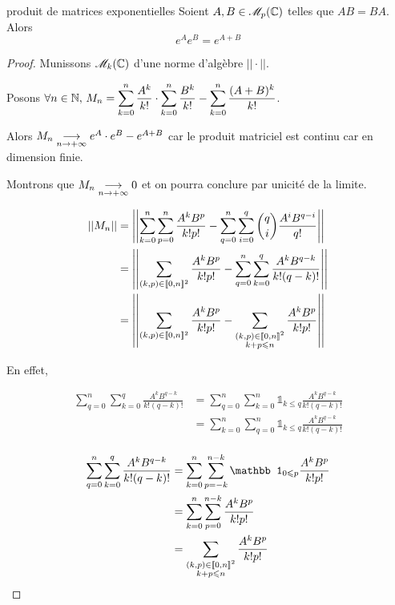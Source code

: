 \begin{corollaire}{produit de matrices exponentielles}{}
    Soient $A, B \in \mathscr M_p(\mathbb{C})$ telles que $AB = BA$. 
    Alors 
    $$\displaystyle e^A e^B = e^{A + B}$$
\end{corollaire}

\begin{proof}
    Munissons $\mathscr M_k(\mathbb{C})$ d'une norme d'algèbre $||\cdot||$. 

    Posons $\displaystyle \forall n \in \mathbb{N}, \, M_n = \sum_{k = 0 }^{n } \frac{A^k}{k!} \cdot \sum_{k = 0 }^{n } \frac{B^k}{k!} - \sum_{k = 0 }^{n }\frac{(A + B)^k}{k!}$.

    Alors $M_n \underset{n \to + \infty}{\longrightarrow} e^A \cdot e^B - e^{A + B}$ car le produit matriciel est continu
    car en dimension finie. 

    Montrons que $M_n \underset{n \to + \infty}{\longrightarrow} 0$ et on pourra conclure par unicité de la limite. 

    \begin{align*}
        ||M_n|| & = \left|\left| \sum_{k = 0 }^{n } \sum_{p = 0 }^{n } \frac{A^k B^p}{k! p!} - \sum_{q = 0}^n \sum_{i = 0 }^{q } \binom q i \frac{A^i B^{q - i}}{q!} \right|\right| \\
                & = \left|\left| \sum_{(k, p) \in [\![0, n]\!]^2} \frac{A^k B^p}{k! p!} - \sum_{q = 0}^n \sum_{k = 0}^q \frac{A^k B^{q - k}}{k! (q - k)!} \right|\right| \\
                & = \left|\left| \sum_{(k, p) \in [\![0, n]\!]^2} \frac{A^k B^p}{k! p!} - \sum_{\substack{(k, p) \in [\![0, n]\!]^2 \\ k + p \leqslant n}} \frac{A^k B^p}{k! p!} \right|\right| \\
    \end{align*}

    En effet,

    \begin{align*}
        \sum_{q = 0}^n \sum_{k = 0}^q \frac{A^k B^{q - k}}{k! (q - k)!} & = \sum_{q= 0}^n \sum_{k = 0}^n \mathbb 1_{k \leqslant q} \frac{A^k B^{q - k}}{k! (q - k)!} \\
         & = \sum_{k = 0}^n \sum_{q = 0}^n \mathbb 1_{k \leqslant q} \frac{A^k B^{q - k}}{k! (q - k)!} \\
    \end{align*}

    \begin{align*}
        \sum_{q = 0}^n \sum_{k = 0}^q \frac{A^k B^{q - k}}{k! (q - k)!} & = \sum_{ k = 0}^n \sum_{p = -k}^{n - k} \mathbb 1_{0 \leqslant p} \frac{A^k B^p}{k! p!} \\
         & = \sum_{ k = 0}^n \sum_{p = 0}^{n - k} \frac{A^k B^p}{k! p!} \\
         & = \sum_{\substack{(k, p) \in \ninter 0 n^2 \\ k + p \leqslant n}} \frac{A^k B^p}{k! p!} \\
    \end{align*}


\end{proof}
